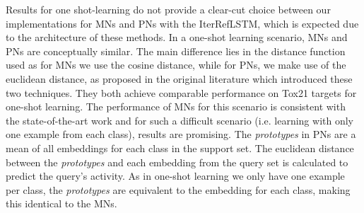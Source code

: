Results for one shot-learning do not provide a clear-cut choice between our implementations for MNs and PNs with the IterRefLSTM, which is expected due to the architecture of these methods.  In a one-shot learning scenario, MNs and PNs are conceptually similar. The main difference lies in the distance function used as for MNs we use the cosine distance, while for PNs, we make use of the euclidean distance, as proposed in the original literature which introduced these two techniques. They both achieve comparable performance on Tox21 targets for one-shot learning. The performance of MNs for this scenario is consistent with the state-of-the-art work and for such a difficult scenario (i.e. learning with only one example from each class), results are promising. The \textit{prototypes} in PNs are a mean of all embeddings for each class in the support set. The euclidean distance between the \textit{prototypes} and each embedding from the query set is calculated to predict the query's activity. As in one-shot learning we only have one example per class, the \textit{prototypes} are equivalent to the embedding for each class, making this identical to the MNs. 

